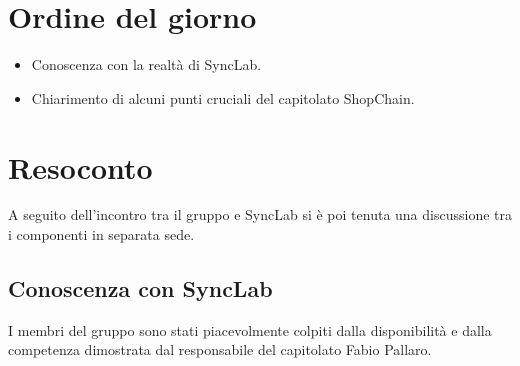\section{Ordine del giorno}
\begin{itemize}
    \item Conoscenza con la realtà di SyncLab.
    \item Chiarimento di alcuni punti cruciali del capitolato ShopChain.
\end{itemize}

\section{Resoconto}
A seguito dell'incontro tra il gruppo e SyncLab si è poi tenuta una discussione tra i componenti in separata sede.

\subsection{Conoscenza con SyncLab}
I membri del gruppo sono stati piacevolmente colpiti dalla disponibilità e dalla competenza dimostrata dal responsabile
del capitolato Fabio Pallaro.

